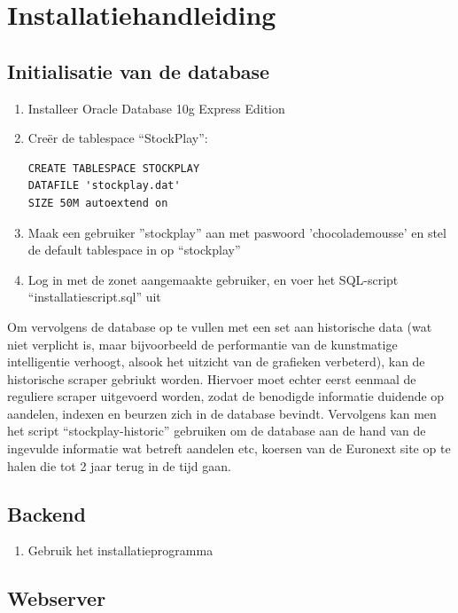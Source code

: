 %
%

\section{Installatiehandleiding}

\subsection{Initialisatie van de database}

\begin{enumerate}
\item{Installeer Oracle Database 10g Express Edition}
\item{Cre\"er de tablespace ``StockPlay'':
\begin{verbatim}
CREATE TABLESPACE STOCKPLAY 
DATAFILE 'stockplay.dat' 
SIZE 50M autoextend on
\end{verbatim}
}
\item{Maak een gebruiker ''stockplay'' aan met paswoord 'chocolademousse' en stel de default tablespace in op ``stockplay''}
\item{Log in met de zonet aangemaakte gebruiker, en voer het SQL-script ``installatiescript.sql'' uit}
\end{enumerate}

Om vervolgens de database op te vullen met een set aan historische data (wat niet verplicht is, maar bijvoorbeeld de performantie van de kunstmatige intelligentie verhoogt, alsook het uitzicht van de grafieken verbeterd), kan de historische scraper gebriukt worden. Hiervoer moet echter eerst eenmaal de reguliere scraper uitgevoerd worden, zodat de benodigde informatie duidende op aandelen, indexen en beurzen zich in de database bevindt. Vervolgens kan men het script ``stockplay-historic'' gebruiken om de database aan de hand van de ingevulde informatie wat betreft aandelen etc, koersen van de Euronext site op te halen die tot 2 jaar terug in de tijd gaan.


\subsection{Backend}

\begin{enumerate}
\item{Gebruik het installatieprogramma}
\end{enumerate}

\subsection{Webserver}

